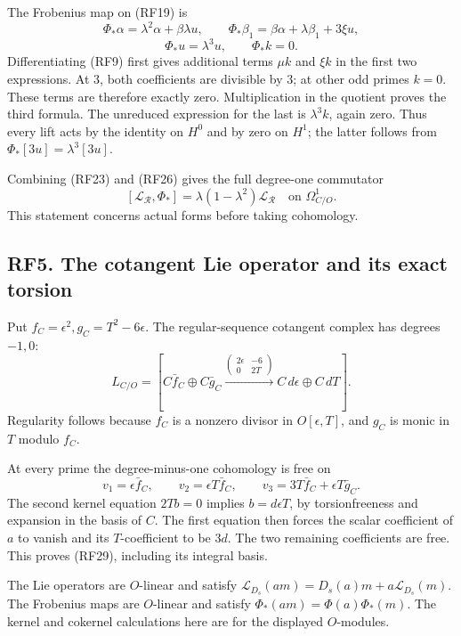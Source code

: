 \documentclass[
  10pt,
]{article}
\begin{document}
The Frobenius map on (RF19) is \[
\Phi_*\alpha=\lambda^2\alpha+\beta\lambda u,\qquad
\Phi_*\beta_1=\beta\alpha+\lambda\beta_1+3\xi u,
\] \[
\Phi_*u=\lambda^3u,\qquad \Phi_*k=0.
\tag{RF26}
\] Differentiating (RF9) first gives additional terms \(\mu k\) and
\(\xi k\) in the first two expressions. At 3, both coefficients are
divisible by 3; at other odd primes \(k=0\). These terms are therefore
exactly zero. Multiplication in the quotient proves the third formula.
The unreduced expression for the last is \(\lambda^3k\), again zero.
Thus every lift acts by the identity on \(H^0\) and by zero on \(H^1\);
the latter follows from \(\Phi_*[3u]=\lambda^3[3u]\).

Combining (RF23) and (RF26) gives the full degree-one commutator \[
[\mathcal L_{\mathcal R},\Phi_*]
=\lambda(1-\lambda^2)\mathcal L_{\mathcal R}
\quad\text{on }\Omega^1_{C/O}.
\tag{RF27}
\] This statement concerns actual forms before taking cohomology.

\subsection{RF5. The cotangent Lie operator and its exact
torsion}\label{rf5.-the-cotangent-lie-operator-and-its-exact-torsion}

Put \(f_C=\epsilon^2,g_C=T^2-6\epsilon\). The regular-sequence cotangent
complex has degrees \(-1,0\): \[
L_{C/O}=
\left[C\bar f_C\oplus C\bar g_C
\xrightarrow{\left(\begin{smallmatrix}2\epsilon&-6\\0&2T\end{smallmatrix}\right)}
C\,d\epsilon\oplus C\,dT\right].
\tag{RF28}
\] Regularity follows because \(f_C\) is a nonzero divisor in
\(O[\epsilon,T]\), and \(g_C\) is monic in \(T\) modulo \(f_C\).

At every prime the degree-minus-one cohomology is free on \[
v_1=\epsilon\bar f_C,\qquad
v_2=\epsilon T\bar f_C,\qquad
v_3=3T\bar f_C+\epsilon T\bar g_C.
\tag{RF29}
\] The second kernel equation \(2Tb=0\) implies \(b=d\epsilon T\), by
torsionfreeness and expansion in the basis of \(C\). The first equation
then forces the scalar coefficient of \(a\) to vanish and its
\(T\)-coefficient to be \(3d\). The two remaining coefficients are free.
This proves (RF29), including its integral basis.

The Lie operators are \(O\)-linear and satisfy
\(\mathcal L_{D_s}(am)=D_s(a)m+a\mathcal L_{D_s}(m)\). The Frobenius
maps are \(O\)-linear and satisfy \(\Phi_*(am)=\Phi(a)\Phi_*(m)\). The
kernel and cokernel calculations here are for the displayed
\(O\)-modules.
\end{document}
